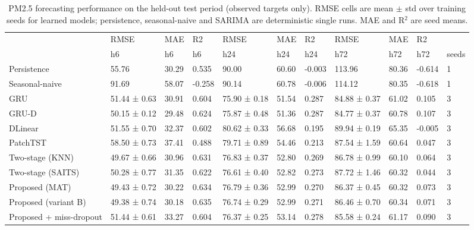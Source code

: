 \begin{table}
\caption{PM2.5 forecasting performance on the held-out test period (observed targets only). RMSE cells are mean $\pm$ std over training seeds for learned models; persistence, seasonal-naive and SARIMA are deterministic single runs. MAE and R$^2$ are seed means.}
\label{tab:main_results}
\begin{tabular}{lllllllllll}
\toprule
 & RMSE & MAE & R2 & RMSE & MAE & R2 & RMSE & MAE & R2 &  \\
 & h6 & h6 & h6 & h24 & h24 & h24 & h72 & h72 & h72 & seeds \\
\midrule
Persistence & 55.76 & 30.29 & 0.535 & 90.00 & 60.60 & -0.003 & 113.96 & 80.36 & -0.614 & 1 \\
Seasonal-naive & 91.69 & 58.07 & -0.258 & 90.14 & 60.78 & -0.006 & 114.12 & 80.35 & -0.618 & 1 \\
GRU & 51.44 ± 0.63 & 30.91 & 0.604 & 75.90 ± 0.18 & 51.54 & 0.287 & 84.88 ± 0.37 & 61.02 & 0.105 & 3 \\
GRU-D & 50.15 ± 0.12 & 29.48 & 0.624 & 75.87 ± 0.48 & 51.36 & 0.287 & 84.77 ± 0.37 & 60.78 & 0.107 & 3 \\
DLinear & 51.55 ± 0.70 & 32.37 & 0.602 & 80.62 ± 0.33 & 56.68 & 0.195 & 89.94 ± 0.19 & 65.35 & -0.005 & 3 \\
PatchTST & 58.50 ± 0.73 & 37.41 & 0.488 & 79.71 ± 0.89 & 54.46 & 0.213 & 87.54 ± 1.59 & 60.64 & 0.047 & 3 \\
Two-stage (KNN) & 49.67 ± 0.66 & 30.96 & 0.631 & 76.83 ± 0.37 & 52.80 & 0.269 & 86.78 ± 0.99 & 60.10 & 0.064 & 3 \\
Two-stage (SAITS) & 50.28 ± 0.77 & 31.35 & 0.622 & 76.61 ± 0.40 & 52.82 & 0.273 & 87.72 ± 1.46 & 60.32 & 0.044 & 3 \\
Proposed (MAT) & 49.43 ± 0.72 & 30.22 & 0.634 & 76.79 ± 0.36 & 52.99 & 0.270 & 86.37 ± 0.45 & 60.32 & 0.073 & 3 \\
Proposed (variant B) & 49.38 ± 0.74 & 30.18 & 0.635 & 76.74 ± 0.29 & 52.99 & 0.271 & 86.46 ± 0.70 & 60.34 & 0.071 & 3 \\
Proposed + miss-dropout & 51.44 ± 0.61 & 33.27 & 0.604 & 76.37 ± 0.25 & 53.14 & 0.278 & 85.58 ± 0.24 & 61.17 & 0.090 & 3 \\
\bottomrule
\end{tabular}
\end{table}
